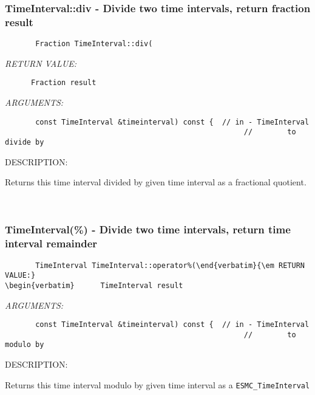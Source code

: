\subsubsection [TimeInterval::div] {TimeInterval::div - Divide two time intervals, return fraction result}


  
\begin{verbatim}       Fraction TimeInterval::div(\end{verbatim}{\em RETURN VALUE:}
\begin{verbatim}      Fraction result\end{verbatim}{\em ARGUMENTS:}
\begin{verbatim}       const TimeInterval &timeinterval) const {  // in - TimeInterval
                                                       //        to divide by\end{verbatim}
{\sf DESCRIPTION:\\ }


      Returns this time interval divided by given time interval as a fractional
      quotient.
   
 
\mbox{}\hrulefill\ 
 
\subsubsection [TimeInterval(\%)] {TimeInterval(\%) - Divide two time intervals, return time interval remainder}


  
\begin{verbatim}       TimeInterval TimeInterval::operator%(\end{verbatim}{\em RETURN VALUE:}
\begin{verbatim}      TimeInterval result\end{verbatim}{\em ARGUMENTS:}
\begin{verbatim}       const TimeInterval &timeinterval) const {  // in - TimeInterval
                                                       //        to modulo by\end{verbatim}
{\sf DESCRIPTION:\\ }


      Returns this time interval modulo by given time interval as a 
      {\tt ESMC\_TimeInterval}
   
 
